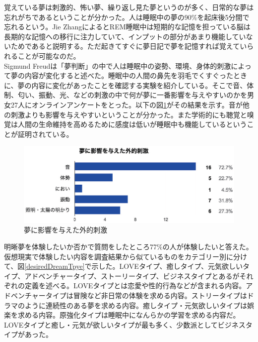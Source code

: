 覚えている夢は刺激的、怖い夢、繰り返し見た夢というのが多く、日常的な夢は忘れがちであるということが分かった。人は睡眠中の夢の90\%を起床後5分間で忘れるという。Jie ZhangによるとREM睡眠中は短期的な記憶を担っている脳は長期的な記憶への移行に注力していて、インプットの部分があまり機能していないためであると説明する\cite{Zhang}。ただ起きてすぐに夢日記で夢を記憶すれば覚えていられることが可能なのだ\cite{forgetDreams}。\\

Sigmund Freudは「夢判断」の中で人は睡眠中の姿勢、環境、身体的刺激によって夢の内容が変化すると述べた\cite{freud}。睡眠中の人間の鼻先を羽毛でくすぐったときに、夢の内容に変化があったことを確認する実験を紹介している。そこで音、体制、匂い、振動、光、などの刺激の中で何が夢に一番影響を与えやすいのかを男女27人にオンラインアンケートをとった。以下の図\ref{externalShigeki}がその結果を示す。音が他の刺激よりも影響を与えやすいということが分かった。また学術的にも聴覚と嗅覚は人間の生命維持を高めるために感度は低いが睡眠中も機能しているということが証明されている\cite{Zhang}。\\

\begin{figure}[htbp]
\begin{center}
\includegraphics[width=15cm]{eps/input.eps}
\caption{夢に影響を与えた外的刺激}
\label{externalShigeki}
\end{center}
\end{figure}

明晰夢を体験したいか否かで質問をしたところ77\%の人が体験したいと答えた。仮想現実で体験したい内容を調査結果から似ているものをカテゴリー別に分けて、図\ref{desiredDreamTpye}で示した。LOVEタイプ、癒しタイプ、元気欲しいタイプ、アドベンチャータイプ、ストーリータイプ、ビジネスタイプとあるがそれぞれの定義を述べる。LOVEタイプとは恋愛や性的行為などが含まれる内容。アドベンチャータイプは冒険など非日常の体験を求める内容。ストリータイプはドラマのように連続性のある夢を求める内容。癒しタイプ・元気欲しいタイプは娯楽を求める内容。原強化タイプは睡眠中になんらかの学習を求める内容だ。LOVEタイプと癒し・元気が欲しいタイプが最も多く、少数派としてビジネスタイプがあった。\\

